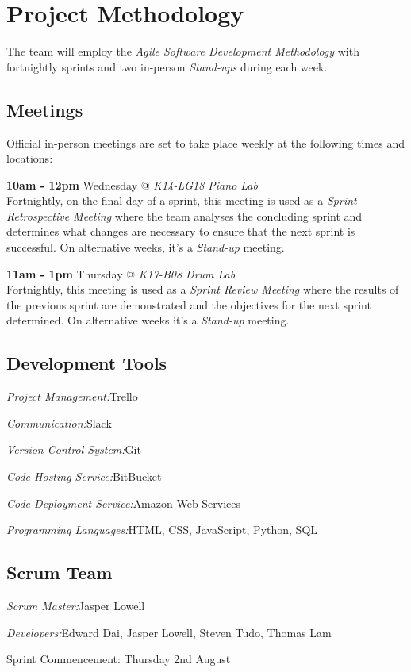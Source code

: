 \documentclass[12pt,a4paper]{article}
\begin{document}
\section *{Project Methodology}

The team will employ the \emph{Agile Software Development Methodology} with fortnightly sprints and two in-person \emph{Stand-ups} during each week.

\subsection *{Meetings}

Official in-person meetings are set to take place weekly at the following times and locations:

\begin{description}
  \item \textbf{10am - 12pm} Wednesday @ \emph{K14-LG18 Piano Lab} \\
      Fortnightly, on the final day of a sprint, this meeting is used as a \emph{Sprint Retrospective Meeting} where the team analyses the concluding sprint and determines what changes are necessary to ensure that the next sprint is successful. On alternative weeks, it's a \emph{Stand-up} meeting.
  \item \textbf{11am - 1pm} Thursday @ \emph{K17-B08 Drum Lab} \\
      Fortnightly, this meeting is used as a \emph{Sprint Review Meeting} where the results of the previous sprint are demonstrated and the objectives for the next sprint determined. On alternative weeks it's a \emph{Stand-up} meeting.
\end{description}

\subsection *{Development Tools}

\begin{description}
  \item \emph{Project Management:}\hfill Trello
  \item \emph{Communication:}\hfill Slack
  \item \emph{Version Control System:}\hfill Git
  \item \emph{Code Hosting Service:}\hfill BitBucket
  \item \emph{Code Deployment Service:}\hfill Amazon Web Services
  \item \emph{Programming Languages:}\hfill HTML, CSS, JavaScript, Python, SQL
\end{description}

\subsection *{Scrum Team}

\smallskip
\begin{description}
  \item \emph{Scrum Master:}\hfill Jasper Lowell
  \item \emph{Developers:}\hfill Edward Dai, Jasper Lowell, Steven Tudo, Thomas Lam
\end{description}
Sprint Commencement: Thursday 2nd August
\end{document}
